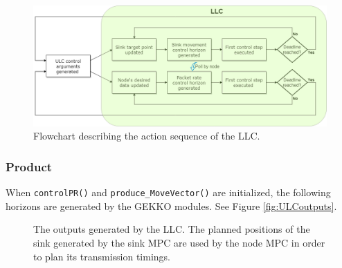 \begin{figure}
    \centering
    \includegraphics[scale=0.35]{Images/LLCflowchart.png}
    \caption{Flowchart describing the action sequence of the LLC.}
    \label{fig:LLCflowchart}
\end{figure}

\subsubsection{Product}
When \verb!controlPR()! and \verb!produce_MoveVector()! are initialized, the following horizons are generated by the GEKKO modules. See Figure \ref{fig:ULCoutputs}.

\begin{figure}[h]
  \centering
  \hfill
  \caption{The outputs generated by the LLC. The planned positions of the sink generated by the sink MPC are used by the node MPC in order to plan its transmission timings.}
  \label{fig:LLCoutputs}
\end{figure}

